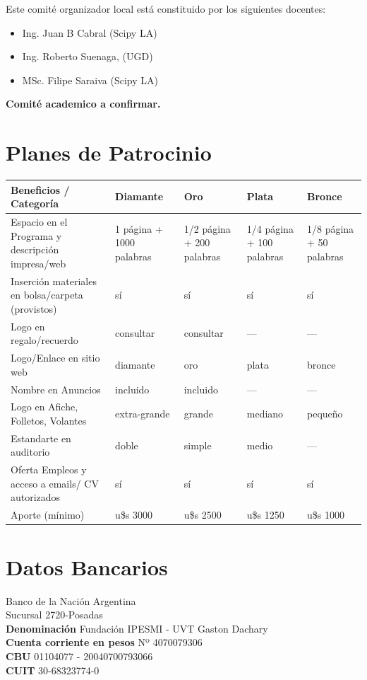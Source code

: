 \documentclass[11pt,a4paper]{report}
\begin{document}
Este comité organizador local está constituido por los siguientes docentes:\\
\begin{itemize}[nolistsep]
    \item Ing. Juan B Cabral (Scipy LA)
    \item Ing. Roberto Suenaga, (UGD)
    \item MSc. Filipe Saraiva (Scipy LA)
\end{itemize}

\textbf{Comité academico a confirmar.}

\section*{Planes de Patrocinio}
\begin{center}

\begin{tabular}{|p{4cm}|p{2.5cm}|p{2.5cm}|p{2.5cm}|p{2.5cm}|}
\hline
Beneficios / Categoría & Diamante & Oro  & Plata & Bronce \\
\hline
Espacio en el Programa y descripción impresa/web & 1 página +
1000 palabras & 1/2 página + 200 palabras & 1/4 página + 100 palabras &  1/8 página + 50 palabras\\
\hline
Inserción materiales en bolsa/carpeta (provistos) & sí & sí & sí & sí \\
\hline
Logo en regalo/recuerdo & consultar & consultar & --- & --- \\
\hline
Logo/Enlace en sitio web & diamante & oro & plata & bronce \\
\hline
Nombre en Anuncios & incluido & incluido & --- & --- \\
\hline
Logo en Afiche, Folletos, Volantes & extra-grande & grande & mediano & pequeño \\
\hline
Estandarte en auditorio & doble & simple & medio & --- \\
\hline
Oferta Empleos y acceso a emails/ CV autorizados  & sí & sí & sí & sí \\
\hline
Aporte (mínimo) & u\$s 3000 & u\$s 2500 & u\$s 1250 & u\$s 1000\\
\hline
\end{tabular}
\end{center}

\section*{Datos Bancarios}
\noindent Banco de la Nación Argentina \\
Sucursal 2720-Posadas \\
\textbf{Denominación} Fundación IPESMI - UVT Gaston Dachary \\
\textbf{Cuenta corriente en pesos} Nº 4070079306 \\
\textbf{CBU} 01104077 - 20040700793066 \\
\textbf{CUIT} 30-68323774-0 \\
\end{document}
